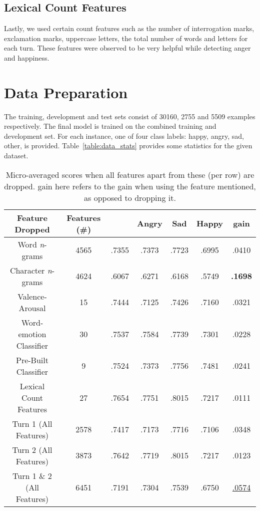 \documentclass[11pt,a4paper]{article}
\begin{document}
\subsection{Lexical Count Features} \label{Lexical Features}
Lastly, we used certain count features such as the number of interrogation marks, exclamation marks, uppercase letters, the total number of words and letters for each turn. These features were observed to be very helpful while detecting anger and happiness.

\section{Data Preparation}

The training, development and test sets consist of 30160, 2755 and 5509 examples respectively. The final model is trained on the combined training and development set. For each instance, one of four class labels: happy, angry, sad, other, is provided. Table~\ref{table:data_stats} provides some statistics for the given dataset.
\begin{table*}[t]
\centering
 \begin{tabular}{||c |c |c |c | c| c| c||} 
 \hline
 Feature Dropped & Features (\#) &  & Angry  & Sad  & Happy  &  gain\\
 \hline
 Word \textit{n}-grams & 4565 & .7355 & .7373 & .7723 & .6995 & .0410\\
 Character \textit{n}-grams & 4624 & .6067 & .6271 & .6168 & .5749 & \textbf{.1698}\\
 Valence-Arousal & 15 & .7444 & .7125 & .7426 & .7160 & .0321\\
 Word-emotion Classifier & 30 & .7537 & .7584 & .7739 & .7301 & .0228\\
 Pre-Built Classifier & 9 & .7524 & .7373 & .7756 & .7481 & .0241\\
 Lexical Count Features & 27 & .7654 & .7751 & .8015 & .7217 & .0111\\
 \hline
 Turn 1 (All Features) & 2578 & .7417 & .7173 & .7716 & .7106 & .0348\\
 Turn 2 (All Features) & 3873 & .7642 & .7719 & .8015 & .7217 & .0123\\
 Turn 1 \& 2 (All Features) & 6451 & .7191 & .7304 & .7539 & .6750 & \underline{.0574}\\
 \hline
 \end{tabular}
 \caption{Micro-averaged  scores when all features apart from these (per row) are dropped.  gain here refers to the gain when using the feature mentioned, as opposed to dropping it.}
 \label{table:ablation}
\end{table*}
\end{document}
